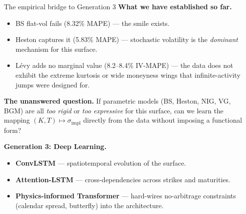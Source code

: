 \documentclass[aspectratio=169]{beamer}
\begin{document}
\begin{frame}{The empirical bridge to Generation 3}
  \textbf{What we have established so far.}
  \begin{itemize}
    \item BS flat-vol fails (8.32\% MAPE) --- the smile exists.
    \item Heston captures it (5.83\% MAPE) --- stochastic volatility is
      the \emph{dominant} mechanism for this surface.
    \item Lévy adds no marginal value (8.2--8.4\% IV-MAPE) --- the data
      does not exhibit the extreme kurtosis or wide moneyness wings that
      infinite-activity jumps were designed for.
  \end{itemize}

  \vspace{0.3cm}
  \textbf{The unanswered question.}
  If parametric models (BS, Heston, NIG, VG, BGM) are all \emph{too rigid}
  or \emph{too expressive} for this surface, can we learn the mapping
  $(K, T) \mapsto \sigma_{\text{impl}}$ directly from the data without
  imposing a functional form?

  \vspace{0.3cm}
  \textbf{Generation 3: Deep Learning.}
  \begin{itemize}
    \item \textbf{ConvLSTM} --- spatiotemporal evolution of the surface.
    \item \textbf{Attention-LSTM} --- cross-dependencies across strikes
      and maturities.
    \item \textbf{Physics-informed Transformer} --- hard-wires no-arbitrage
      constraints (calendar spread, butterfly) into the architecture.
  \end{itemize}
\end{frame}
\end{document}
